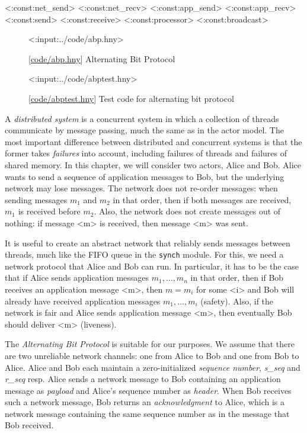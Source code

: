 \documentclass{report}
\newcommand{\harmonylink}[1]{%
[\href{https://harmony.cs.cornell.edu/#1}{\underline{#1}}]%
}
\newenvironment{code}{
\tcolorbox
}{
\endtcolorbox
}
\begin{document}
{<{:const:net_send}>
<{:const:net_recv}>
<{:const:app_send}>
<{:const:app_recv}>
<{:const:send}>
<{:const:receive}>
<{:const:processor}>
<{:const:broadcast}>

\begin{figure}
\begin{code}
<{:input:../code/abp.hny}>
\end{code}
\caption{\harmonylink{code/abp.hny} Alternating Bit Protocol}
\label{fig:abp}
\end{figure}

\begin{figure}
\begin{code}
<{:input:../code/abptest.hny}>
\end{code}
\caption{\harmonylink{code/abptest.hny} Test code for alternating bit protocol}
\label{fig:abptest}
\end{figure}

A
\emph{distributed system}
%
is a concurrent system in which a collection
of threads communicate by message passing, much the same as
in the actor model.
The most important difference between distributed and concurrent
systems is that the former takes \emph{failures}
%
into account,
including failures of threads and failures of shared memory.
In this chapter, we will consider two actors, Alice and Bob.
Alice wants to send a sequence of application messages to Bob,
but the underlying network may lose messages.
%
The network does not re-order messages: when sending messages
$m_1$ and $m_2$ in that order, then if both messages are received,
$m_1$ is received before $m_2$.
Also, the network does not create messages out of nothing: if
message <{m}> is received, then message <{m}> was sent.

It is useful to create an abstract network that reliably sends messages
between threads, much like the FIFO queue in the \texttt{synch} module.
For this, we need a network protocol that Alice and Bob can run.
In particular, it has to be the case that if Alice sends application
messages $m_1, ..., m_n$ in that order, then if Bob receives an
application message
<{m}>, then $m = m_i$ for some <{i}> and Bob will already have received
application messages $m_1, ..., m_i$ (safety).
Also, if the network is fair and Alice sends application message
<{m}>, then eventually Bob should deliver <{m}> (liveness).

The \emph{Alternating Bit Protocol} is suitable for our purposes.
We assume that there are two unreliable network channels: one from Alice
to Bob and one from Bob to Alice.
Alice and Bob each maintain a zero-initialized
\emph{sequence number},
%
\textit{s\_seq} and \textit{r\_seq} resp.
Alice sends a network message to Bob containing an
application message as \emph{payload} and Alice's sequence number
as \emph{header}.
When Bob receives such a network message, Bob returns an
\emph{acknowledgment}
%
to Alice, which is a network message
containing the same sequence number as in the message that Bob received.

}
\end{document}

